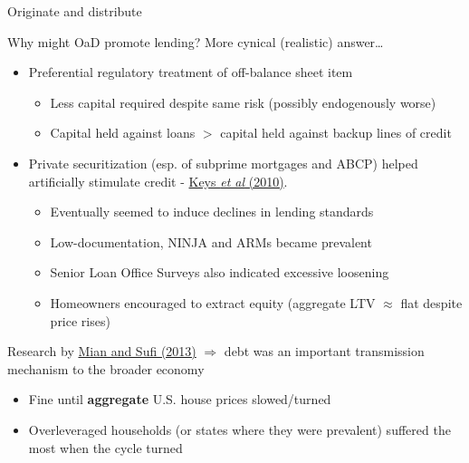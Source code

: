 \begin{frame}{Originate and distribute}

Why might OaD promote lending? More cynical (realistic) answer\ldots
	\begin{itemize}
	\item	Preferential regulatory treatment of off-balance sheet item
		\begin{itemize}
		\item	Less capital required despite same risk (possibly endogenously worse)
		\item	Capital held against loans $>$ capital held against backup lines of credit
		\end{itemize}
	\vspace{0.5mm}
	\item	Private securitization (esp. of subprime mortgages and ABCP) helped artificially stimulate credit  - \href{https://academic.oup.com/qje/article-abstract/125/1/307/1880343?redirectedFrom=fulltext}{Keys \emph{et al} (2010)}.
		\begin{itemize}
		\item	Eventually seemed to induce declines in lending standards
		\item	Low-documentation, NINJA and ARMs became prevalent
		\item	Senior Loan Office Surveys also indicated excessive loosening
		\item	Homeowners encouraged to extract equity (aggregate LTV $\approx$ flat despite price rises)	
		\end{itemize}
	\end{itemize}

\vspace{2mm}
Research by \href{https://academic.oup.com/qje/article-abstract/128/4/1687/1849337}{Mian and Sufi (2013)} $\Rightarrow$ debt was an important transmission mechanism to the broader economy
		\begin{itemize}
		\item	Fine until \textbf{aggregate} U.S. house prices slowed/turned
		\item	Overleveraged households (or states where they were prevalent) suffered the most when the cycle turned
		\end{itemize}
	
\end{frame}



